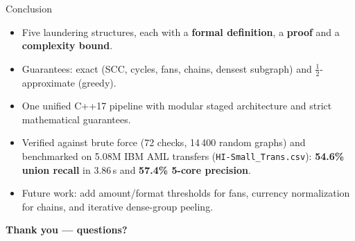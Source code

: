 \documentclass[aspectratio=169,11pt]{beamer}
\begin{document}
\begin{frame}{Conclusion}
\begin{itemize}
\setlength{\itemsep}{0.4em}
\item Five laundering structures, each with a \textbf{formal definition}, a \textbf{proof} and a \textbf{complexity bound}.
\item Guarantees: exact (SCC, cycles, fans, chains, densest subgraph) and $\frac{1}{2}$-approximate (greedy).
\item One unified C++17 pipeline with modular staged architecture and strict mathematical guarantees.
\item Verified against brute force (72 checks, 14\,400 random graphs) and benchmarked on 5.08M IBM AML transfers (\texttt{HI-Small\_Trans.csv}): \textbf{54.6\% union recall} in 3.86\,s and \textbf{57.4\% 5-core precision}.
\item Future work: add amount/format thresholds for fans, currency normalization for chains, and iterative dense-group peeling.
\end{itemize}

\vspace{0.35cm}
\centering
{\Large\bfseries\color{accent} Thank you --- questions?}
\end{frame}
\end{document}
